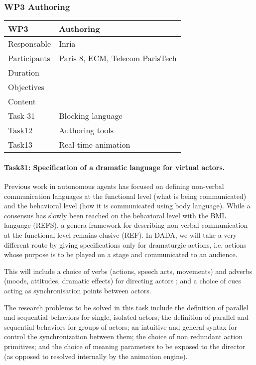 \subsubsection{WP3 Authoring}


\begin{center}
\begin{tabular}{|l|l|}\hline
WP3 &  Authoring \\\hline
Responsable &  Inria  \\\hline
Participants &  Paris 8, ECM, Telecom ParisTech\\\hline
Duration  &   \\\hline
Objectives &   \\\hline
Content &  \\\hline
Task 31 & Blocking language  \\\hline
Task12 &  Authoring tools \\\hline
Task13 &  Real-time animation  \\\hline
\end{tabular}
\end{center}


\paragraph{Task31: Specification of a dramatic language for virtual actors.}

Previous work in autonomous agents has focused on defining non-verbal communication languages at the functional level (what is being communicated) and the behavioral level (how it is communicated using body language). While a consensus has slowly been reached on the behavioral level with the BML language (REFS), a genera framework for describing non-verbal communication at the functional level remains elusive (REF). In DADA, we will take a very different route by giving specifications only for dramaturgic actions,
i.e. actions whose purpose is to be played on a stage and communicated to an audience.

This will include a choice of verbs (actions, speech acts, movements) and adverbs (moods, attitudes, dramatic effects) 
for directing actors ; and a choice of cues acting as synchronisation points between actors.

The research problems to be solved in this task include the definition of parallel and sequential behaviors
for single, isolated actors; the definition of parallel and sequential behaviors for groups of actors; an intuitive and general 
syntax for control the synchronization between them; the choice of non redundant action primitives; and the choice of meaning parameters to be exposed to the director (as opposed to resolved internally by the animation engine).

